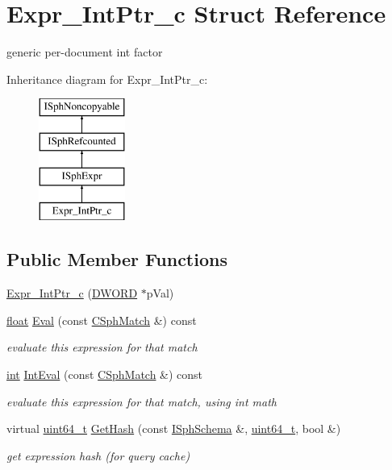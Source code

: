 \hypertarget{structExpr__IntPtr__c}{\section{Expr\-\_\-\-Int\-Ptr\-\_\-c Struct Reference}
\label{structExpr__IntPtr__c}
}


generic per-\/document int factor  


Inheritance diagram for Expr\-\_\-\-Int\-Ptr\-\_\-c\-:\begin{figure}[H]
\begin{center}
\leavevmode
\includegraphics[height=4.000000cm]{structExpr__IntPtr__c}
\end{center}
\end{figure}
\subsection*{Public Member Functions}
\begin{DoxyCompactItemize}
\item 
\hyperlink{structExpr__IntPtr__c_a07abe4a3bee949ad2ac6a0a8223be6b7}{Expr\-\_\-\-Int\-Ptr\-\_\-c} (\hyperlink{sphinxstd_8h_a798af1e30bc65f319c1a246cecf59e39}{D\-W\-O\-R\-D} $\ast$p\-Val)
\item 
\hyperlink{sphinxexpr_8cpp_a0e0d0739f7035f18f949c2db2c6759ec}{float} \hyperlink{structExpr__IntPtr__c_a9e15cac2f6dff72c831199bb0373869a}{Eval} (const \hyperlink{classCSphMatch}{C\-Sph\-Match} \&) const 
\begin{DoxyCompactList}\small\item\em evaluate this expression for that match \end{DoxyCompactList}\item 
\hyperlink{sphinxexpr_8cpp_a4a26e8f9cb8b736e0c4cbf4d16de985e}{int} \hyperlink{structExpr__IntPtr__c_acd1dc349246146786848f726f813360a}{Int\-Eval} (const \hyperlink{classCSphMatch}{C\-Sph\-Match} \&) const 
\begin{DoxyCompactList}\small\item\em evaluate this expression for that match, using int math \end{DoxyCompactList}\item 
virtual \hyperlink{sphinxstd_8h_aaa5d1cd013383c889537491c3cfd9aad}{uint64\-\_\-t} \hyperlink{structExpr__IntPtr__c_a409862c66c7d3a4807c8f51506b89e4b}{Get\-Hash} (const \hyperlink{classISphSchema}{I\-Sph\-Schema} \&, \hyperlink{sphinxstd_8h_aaa5d1cd013383c889537491c3cfd9aad}{uint64\-\_\-t}, bool \&)
\begin{DoxyCompactList}\small\item\em get expression hash (for query cache) \end{DoxyCompactList}\end{DoxyCompactItemize}
